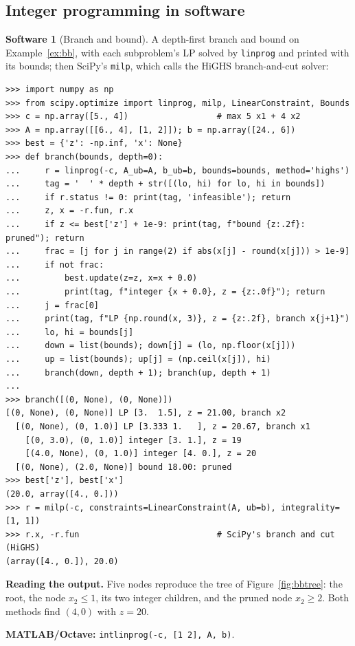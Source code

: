 \documentclass[11pt,a4paper]{article}
\numberwithin{equation}{section}
\theoremstyle{definition}
\newtheorem{software}[thm]{Software}
\begin{document}
\subsection{Integer programming in software}
\label{ssec:software9}

\begin{software}[Branch and bound]
\label{sw:bb}
A depth-first branch and bound on Example~\ref{ex:bb}, with each subproblem's LP solved by \texttt{linprog} and printed with its bounds; then SciPy's \texttt{milp}, which calls the HiGHS branch-and-cut solver:
{\small\begin{verbatim}
>>> import numpy as np
>>> from scipy.optimize import linprog, milp, LinearConstraint, Bounds
>>> c = np.array([5., 4])                  # max 5 x1 + 4 x2
>>> A = np.array([[6., 4], [1, 2]]); b = np.array([24., 6])
>>> best = {'z': -np.inf, 'x': None}
>>> def branch(bounds, depth=0):
...     r = linprog(-c, A_ub=A, b_ub=b, bounds=bounds, method='highs')
...     tag = '  ' * depth + str([(lo, hi) for lo, hi in bounds])
...     if r.status != 0: print(tag, 'infeasible'); return
...     z, x = -r.fun, r.x
...     if z <= best['z'] + 1e-9: print(tag, f"bound {z:.2f}: pruned"); return
...     frac = [j for j in range(2) if abs(x[j] - round(x[j])) > 1e-9]
...     if not frac:
...         best.update(z=z, x=x + 0.0)
...         print(tag, f"integer {x + 0.0}, z = {z:.0f}"); return
...     j = frac[0]
...     print(tag, f"LP {np.round(x, 3)}, z = {z:.2f}, branch x{j+1}")
...     lo, hi = bounds[j]
...     down = list(bounds); down[j] = (lo, np.floor(x[j]))
...     up = list(bounds); up[j] = (np.ceil(x[j]), hi)
...     branch(down, depth + 1); branch(up, depth + 1)
...
>>> branch([(0, None), (0, None)])
[(0, None), (0, None)] LP [3.  1.5], z = 21.00, branch x2
  [(0, None), (0, 1.0)] LP [3.333 1.   ], z = 20.67, branch x1
    [(0, 3.0), (0, 1.0)] integer [3. 1.], z = 19
    [(4.0, None), (0, 1.0)] integer [4. 0.], z = 20
  [(0, None), (2.0, None)] bound 18.00: pruned
>>> best['z'], best['x']
(20.0, array([4., 0.]))
>>> r = milp(-c, constraints=LinearConstraint(A, ub=b), integrality=[1, 1])
>>> r.x, -r.fun                            # SciPy's branch and cut (HiGHS)
(array([4., 0.]), 20.0)
\end{verbatim}}
\textbf{Reading the output.} Five nodes reproduce the tree of Figure~\ref{fig:bbtree}: the root, the node $x_2 \leq 1$, its two integer children, and the pruned node $x_2 \geq 2$. Both methods find $(4, 0)$ with $z = 20$.

\textbf{MATLAB/Octave:} \texttt{intlinprog(-c, [1 2], A, b)}.
\end{software}
\end{document}
